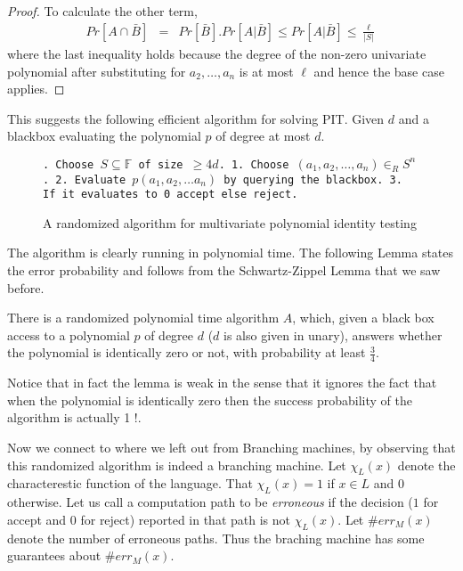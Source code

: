 \begin{proof}
To calculate the other term,
\begin{eqnarray*}
Pr[A \cap \bar{B}] & = & Pr[\bar{B}].Pr[A|\bar{B}] \le Pr[A|\bar{B}] \le \frac{\ell}{|S|}
\end{eqnarray*}
where the last inequality holds because the degree of the non-zero
univariate polynomial after substituting for $a_2, \ldots, a_n$ is at
most $\ell$ and hence the base case applies.
\end{proof}

This suggests the following efficient algorithm for solving PIT. Given $d$ and a
blackbox evaluating the polynomial $p$ of degree at most $d$.

\begin{figure}[ht]
{\tt \obeyspaces {}. Choose $S \subseteq \mathbb{F}$ of size $\ge 4d$.
1. Choose $(a_1, a_2, \ldots, a_n) \in_R S^n$.
2. Evaluate $p(a_1, a_2, \ldots a_n)$ by querying the blackbox.
3. If it evaluates to 0 accept else reject.
}
\caption{A randomized algorithm for multivariate polynomial identity testing}
\end{figure}

The algorithm is clearly running in polynomial time. The following
Lemma states the error probability and follows from the
Schwartz-Zippel Lemma that we saw before.
\begin{lemma}
There is a randomized polynomial time algorithm $A$, which, given a black
box access to a polynomial $p$ of degree $d$ ($d$ is also given in unary), answers whether the polynomial is identically zero or not,
with probability at least $\frac{3}{4}$.
\end{lemma}

Notice that in fact the lemma is weak in the sense that it ignores the
fact that when the polynomial is identically zero then the success
probability of the algorithm is actually 1 !.

Now we connect to where we left out from Branching machines, by
observing that this randomized algorithm is indeed a branching machine.
Let $\chi_L(x)$ denote the characterestic function of the
language. That $\chi_L(x) = 1$ if $x \in L$ and $0$ otherwise.  Let us
call a computation path to be {\em erroneous} if the decision ($1$ for
accept and $0$ for reject) reported in that path is not
$\chi_L(x)$.  Let $\#err_M(x)$ denote the number of erroneous paths.
Thus the braching machine has some guarantees about $\#err_M(x)$.

